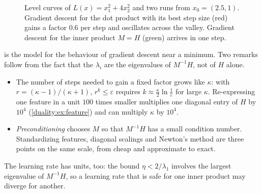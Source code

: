 \begin{notechapter}
\begin{figure}[ht]
\centering
{}
\caption{Level curves of $L(x) = x_1^2 + 4x_2^2$ and two runs from
$x_0 = (2.5, 1)$. Gradient descent for the dot product with its best step
size (red) gains a factor $0.6$ per step and oscillates across the valley.
Gradient descent for the inner product $M = H$ (green) arrives in one
step.}
\label{spectral-svd:fig:zigzag}
\end{figure}

\begin{mlthread}
 is the model for the behaviour of gradient
descent near a minimum. Two remarks follow from the fact that the
$\lambda_i$ are the eigenvalues of $M^{-1}H$, not of $H$ alone.
\begin{itemize}[nosep]
  \item The number of steps needed to gain a fixed factor grows like
        $\kappa$: with $r = (\kappa - 1)/(\kappa + 1)$,
        $r^k\leq\varepsilon$ requires
        $k\approx\frac\kappa2\ln\frac1\varepsilon$ for large $\kappa$.
        Re-expressing one feature in a unit $100$ times smaller
        multiplies one diagonal entry of $H$ by $10^4$
        (\cref{duality:ex:feature}) and can multiply $\kappa$ by $10^4$.
  \item \emph{Preconditioning} chooses $M$ so that $M^{-1}H$ has a small
        condition number. Standardizing features, diagonal scalings and
        Newton's method are three points on the same scale, from cheap
        and approximate to exact.
\end{itemize}
The learning rate has units, too: the bound $\eta < 2/\lambda_1$ involves
the largest eigenvalue of $M^{-1}H$, so a learning rate that is safe for
one inner product may diverge for another.
\end{mlthread}


\end{notechapter}
